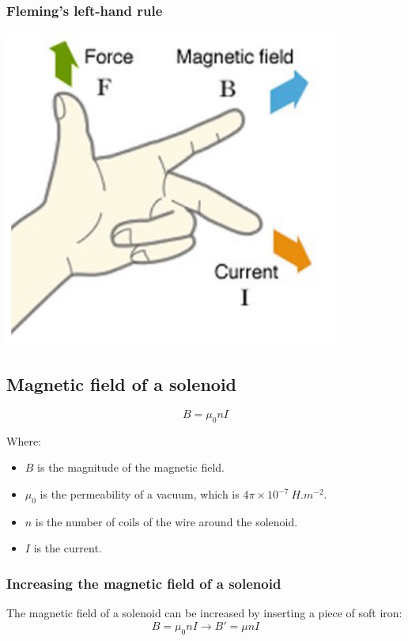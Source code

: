 \documentclass[11pt]{article}
\begin{document}
\subsubsection{Fleming's left-hand rule}
\label{sec:orgb9d7455}

\begin{center}
\includegraphics[scale=0.6]{./images/flemings-left-hand-rule.png}
\end{center}
\subsection{Magnetic field of a solenoid}
\label{sec:orga2ed475}
\[B = \mu_0 n I\]

Where:
\begin{itemize}
\item \(B\) is the magnitude of the magnetic field.
\item \(\mu_0\) is the permeability of a vacuum, which is \(4 \pi \times 10^{-7} \ \unit{H.m^{-2}}\).
\item \(n\) is the number of coils of the wire around the solenoid.
\item \(I\) is the current.
\end{itemize}
\subsubsection{Increasing the magnetic field of a solenoid}
\label{sec:orgcb1de37}
The magnetic field of a solenoid can be increased by inserting a piece of soft iron:
\[B = \mu_0 n I \rightarrow B' = \mu nI\]
\end{document}
